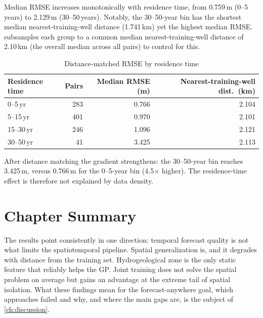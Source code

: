 Median RMSE increases monotonically with residence time, from 0.759\,m (0--5\,years) to
2.129\,m (30--50\,years). Notably, the 30--50-year bin has the shortest median nearest-training-well distance
(1.741\,km) yet the highest median RMSE. 
subsamples each group to a common median nearest-training-well distance of 2.10\,km (the overall median across
all pairs) to control for this.

\begin{table}[htbp]
\centering
\begin{tabular}{lrrr}
\toprule
\textbf{Residence time} & \textbf{Pairs} & \textbf{Median RMSE (m)} & \textbf{Nearest-training-well dist.\ (km)} \\
\midrule
0--5\,yr   & 283 & 0.766 & 2.104 \\
5--15\,yr  & 401 & 0.970 & 2.101 \\
15--30\,yr & 246 & 1.096 & 2.121 \\
30--50\,yr &  41 & 3.425 & 2.113 \\
\bottomrule
\end{tabular}
\caption{Distance-matched RMSE by residence time}
\label{tab:residence_time_dist_matched}
\end{table}

After distance matching the gradient strengthens: the 30--50-year bin reaches 3.425\,m,
versus 0.766\,m for the 0--5-year bin (4.5$\times$ higher). The residence-time effect is therefore not explained by data density.

\section{Chapter Summary}

The results point consistently in one direction: temporal forecast quality is not what limits the spatiotemporal pipeline. Spatial generalization is, and it degrades with distance from the training set. Hydrogeological zone is the only static feature that reliably helps the GP. Joint training does not solve the spatial problem on average but gains an advantage at the extreme tail of spatial isolation. What these findings mean for the forecast-anywhere goal, which approaches failed and why, and where the main gaps are, is the subject of \cref{ch:discussion}.
